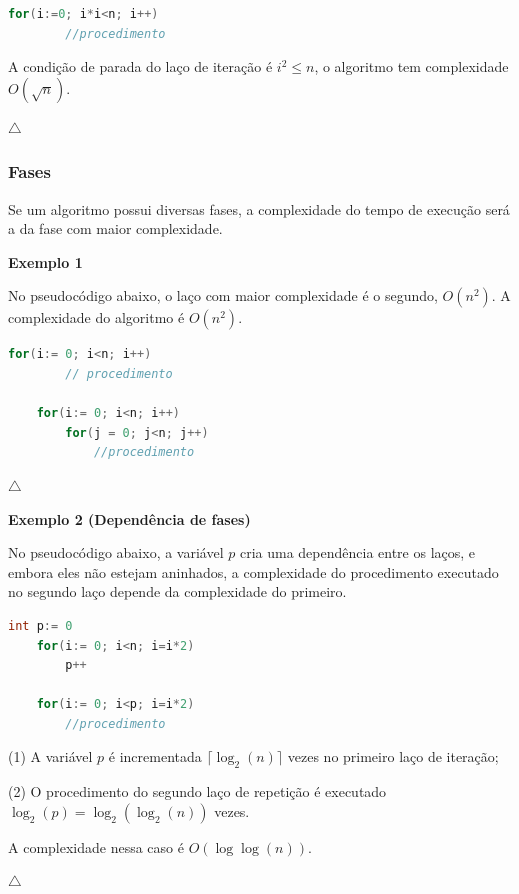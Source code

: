 \begin{lstlisting}[language=C, frame=single]
    for(i:=0; i*i<n; i++)
        //procedimento
\end{lstlisting}

A condição de parada do laço de iteração é $i^2  \leq n$, o algoritmo tem complexidade $O(\sqrt{n})$.

{\raggedleft $\bigtriangleup$ \par}

\subsubsection{Fases}

Se um algoritmo possui diversas fases, a complexidade do tempo de execução será a da fase com maior complexidade.

\textbf{Exemplo 1}

No pseudocódigo abaixo, o laço com maior complexidade é o segundo, $O(n^2)$. A complexidade do algoritmo é $O(n^2)$.

\begin{lstlisting}[language=C, frame=single]
    for(i:= 0; i<n; i++)
        // procedimento
    
    for(i:= 0; i<n; i++)
        for(j = 0; j<n; j++)
            //procedimento
\end{lstlisting}
    
{\raggedleft $\bigtriangleup$ \par}

\textbf{Exemplo 2 (Dependência de fases)}  

No pseudocódigo abaixo, a variável $p$ cria uma dependência entre os laços, e embora eles não estejam aninhados, a complexidade do procedimento executado no segundo laço depende da complexidade do primeiro.

\begin{lstlisting}[language=C, frame=single]
    int p:= 0
    for(i:= 0; i<n; i=i*2)
        p++
    
    for(i:= 0; i<p; i=i*2)
        //procedimento
\end{lstlisting}

(1) A variável $p$ é incrementada $\lceil \log_2(n) \rceil$ vezes no primeiro laço de iteração;

(2) O procedimento do segundo laço de repetição é executado $\log_2(p) = \log_2(\log_2(n))$ vezes.

A complexidade nessa caso é $O(\log\log(n))$.

{\raggedleft $\bigtriangleup$ \par}

